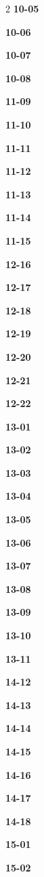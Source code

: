 \documentclass[10pt,a4paper]{article}
\begin{document}
\begin{multicols}{2}
\noindent\textbf{10-05}\ \par
\noindent\textbf{10-06}\ \par
\noindent\textbf{10-07}\ \par
\noindent\textbf{10-08}\ \par
\noindent\textbf{11-09}\ \par
\noindent\textbf{11-10}\ \par
\noindent\textbf{11-11}\ \par
\noindent\textbf{11-12}\ \par
\noindent\textbf{11-13}\ \par
\noindent\textbf{11-14}\ \par
\noindent\textbf{11-15}\ \par
\noindent\textbf{12-16}\ \par
\noindent\textbf{12-17}\ \par
\noindent\textbf{12-18}\ \par
\noindent\textbf{12-19}\ \par
\noindent\textbf{12-20}\ \par
\noindent\textbf{12-21}\ \par
\noindent\textbf{12-22}\ \par
\noindent\textbf{13-01}\ \par
\noindent\textbf{13-02}\ \par
\noindent\textbf{13-03}\ \par
\noindent\textbf{13-04}\ \par
\noindent\textbf{13-05}\ \par
\noindent\textbf{13-06}\ \par
\noindent\textbf{13-07}\ \par
\noindent\textbf{13-08}\ \par
\noindent\textbf{13-09}\ \par
\noindent\textbf{13-10}\ \par
\noindent\textbf{13-11}\ \par
\noindent\textbf{14-12}\ \par
\noindent\textbf{14-13}\ \par
\noindent\textbf{14-14}\ \par
\noindent\textbf{14-15}\ \par
\noindent\textbf{14-16}\ \par
\noindent\textbf{14-17}\ \par
\noindent\textbf{14-18}\ \par
\noindent\textbf{15-01}\ \par
\noindent\textbf{15-02}\ \par

\end{multicols}
\end{document}
